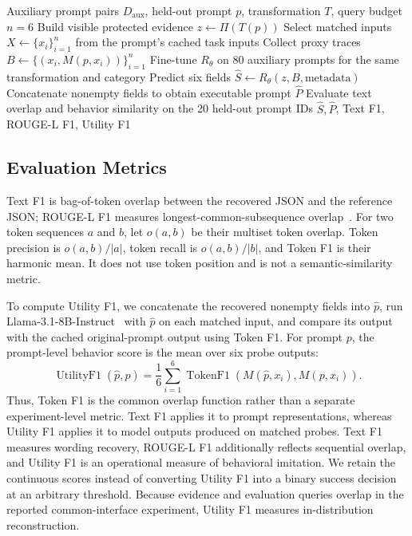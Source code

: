 \documentclass[letterpaper]{article} %
\begin{document}
\begin{algorithm}[t]
\caption{Multi-Evidence Structured Prompt Recovery}
\label{alg:recovery}
\begin{algorithmic}[1]
\REQUIRE Auxiliary prompt pairs \(D_{\mathrm{aux}}\), held-out prompt \(p\), transformation \(T\), query budget \(n=6\)
\STATE Build visible protected evidence \(z\leftarrow\Pi(T(p))\)
\STATE Select matched inputs \(X\leftarrow\{x_i\}_{i=1}^{n}\) from the prompt's cached task inputs
\STATE Collect proxy traces \(B\leftarrow\{(x_i,M(p,x_i))\}_{i=1}^{n}\)
\STATE Fine-tune \(R_\theta\) on 80 auxiliary prompts for the same transformation and category
\STATE Predict six fields \(\hat{S}\leftarrow R_\theta(z,B,\text{metadata})\)
\STATE Concatenate nonempty fields to obtain executable prompt \(\hat{P}\)
\STATE Evaluate text overlap and behavior similarity on the 20 held-out prompt IDs
\RETURN \(\hat{S},\hat{P}\), Text F1, ROUGE-L F1, Utility F1
\end{algorithmic}
\end{algorithm}

\subsection{Evaluation Metrics}

Text F1 is bag-of-token overlap between the recovered JSON and the reference JSON; ROUGE-L F1 measures longest-common-subsequence overlap~\citep{lin2004rouge}.  For two token sequences \(a\) and \(b\), let \(o(a,b)\) be their multiset token overlap.  Token precision is \(o(a,b)/|a|\), token recall is \(o(a,b)/|b|\), and Token F1 is their harmonic mean.  It does not use token position and is not a semantic-similarity metric.

To compute Utility F1, we concatenate the recovered nonempty fields into \(\hat{p}\), run Llama-3.1-8B-Instruct~\citep{grattafiori2024llama3} with \(\hat{p}\) on each matched input, and compare its output with the cached original-prompt output using Token F1.  For prompt \(p\), the prompt-level behavior score is the mean over six probe outputs:
\[
\operatorname{UtilityF1}(\hat{p},p)=\frac{1}{6}\sum_{i=1}^{6}\operatorname{TokenF1}(M(\hat{p},x_i),M(p,x_i)).
\]
Thus, Token F1 is the common overlap function rather than a separate experiment-level metric.  Text F1 applies it to prompt representations, whereas Utility F1 applies it to model outputs produced on matched probes.  Text F1 measures wording recovery, ROUGE-L F1 additionally reflects sequential overlap, and Utility F1 is an operational measure of behavioral imitation.  We retain the continuous scores instead of converting Utility F1 into a binary success decision at an arbitrary threshold.  Because evidence and evaluation queries overlap in the reported common-interface experiment, Utility F1 measures in-distribution reconstruction.
\end{document}
